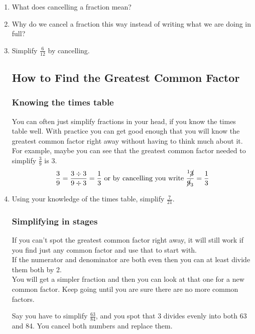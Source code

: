 \documentclass[14pt]{article}
\begin{document}
\begin{enumerate}
\item What does cancelling a fraction mean?
\item Why do we cancel a fraction this way instead of writing what we are doing in full?
\item Simplify $\frac{6}{12}$ by cancelling.

\newpage

\subsection*{How to Find the Greatest Common Factor}

\subsubsection*{Knowing the times table} You can often just simplify fractions in your head, if you know the times table well. With practice you can get good enough that you will know the greatest common factor right away without having to think much about it.\\

For example, maybe you can see that the greatest common factor needed to simplify $\frac{3}{9}$ is 3.
$$\frac{3}{9} = \frac{3 \div 3}{9 \div 3} = \frac{1}{3} \text{   or by cancelling you write }\frac{^1\cancel{3}}{\cancel{9}_3} = \frac{1}{3}$$

\item Using your knowledge of the times table, simplify $\frac{7}{21}.$

\subsubsection*{Simplifying in stages} If you can't spot the greatest common factor right away, it will still work if you find just any common factor and use that to start with.\\

If the numerator and denominator are both even then you can at least divide them both by 2.\\

You will get a simpler fraction and then you can look at that one for a new common factor. Keep going until you are sure there are no more common factors.\\

\newpage

Say you have to simplify $\frac{63}{84}$, and you spot that 3 divides evenly into both 63 and 84. You cancel both numbers and replace them.


\end{enumerate}
\end{document}
